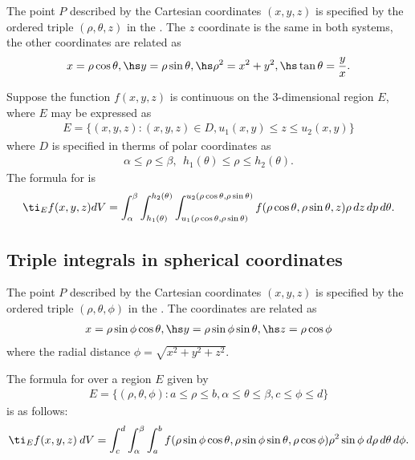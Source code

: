 \documentclass{article}
\begin{document}
\begin{definition}
    The point $P$ described by the Cartesian coordinates $(x,y,z)$ is specified by the
    ordered triple $(\rho,\theta,z)$ in the . The
    $z$ coordinate is the same in both systems, the other coordinates are related as
    \begin{align*}
        x=\rho\cos\theta,\hs y=\rho\sin\theta,\hs
        \rho^2 = x^2+y^2,\hs\tan\theta = \frac{y}{x}.
    \end{align*}
\end{definition}
\begin{theorem}
    Suppose the function $f(x,y,z)$ is continuous on the 3-dimensional region $E$, where $E$
    may be expressed as
    \begin{align*}
        E=\{(x,y,z) : (x,y,z) \in D, u_1(x,y) \leq z \leq u_2(x,y)\}
    \end{align*}
    where $D$ is specified in therms of polar coordinates as
    \begin{align*}
        \alpha \leq \rho \leq \beta,\:\: h_1(\theta) \leq \rho \leq h_2(\theta).
    \end{align*}
    The formula for  is
    \begin{align*}
        \ti_E f(x,y,z) dV = \int_\alpha^\beta \int_{h_1(\theta)}^{h_2(\theta)}
        \int_{u_1(\rho\cos\theta,\rho\sin\theta)}^{u_2(\rho\cos\theta,\rho\sin\theta)}
        f(\rho\cos\theta,\rho\sin\theta,z)\rho\,dz\,dp\,d\theta.
    \end{align*}
\end{theorem}


\subsection{Triple integrals in spherical coordinates}


\begin{definition}
    The point $P$ described by the Cartesian coordinates $(x,y,z)$ is specified by the ordered
    triple $(\rho,\theta,\phi)$ in the . The coordinates are
    related as
    \begin{align*}
        x=\rho\sin\phi\cos\theta,\hs y = \rho \sin\phi\sin\theta,\hs z = \rho\cos\phi
    \end{align*}
    where the radial distance $\phi=\sqrt{x^2+y^2+z^2}$.
\end{definition}
\begin{theorem}
    The formula for  over a region $E$ 
    given by
    \begin{align*}
        E=\{(\rho,\theta,\phi):a\leq\rho\leq b,\alpha\leq\theta\leq\beta, c\leq\phi\leq d\}
    \end{align*}
    is as follows:
    \begin{align*}
        \ti_E f(x,y,z)\:dV = \int_c^d \int_\alpha^\beta \int_a^b f(\rho\sin\phi\cos\theta,\rho\sin\phi\sin\theta,\rho\cos\phi)\rho^2\sin\phi\:d\rho\,d\theta\,d\phi.
    \end{align*}
\end{theorem}
\end{document}
